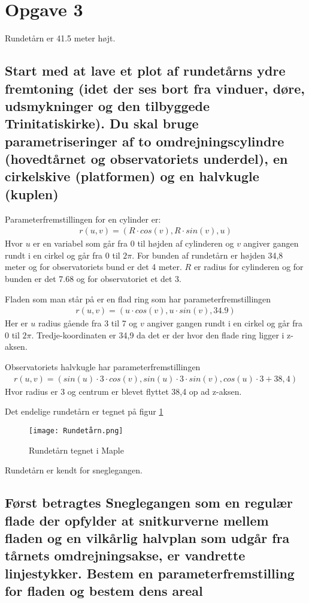 \section{Opgave 3}
Rundetårn er 41.5 meter højt.

\subsection{Start med at lave et plot af rundetårns ydre fremtoning (idet der ses bort fra vinduer, døre, udsmykninger og den tilbyggede Trinitatiskirke). Du skal bruge parametriseringer af to omdrejningscylindre (hovedtårnet og observatoriets underdel), en cirkelskive (platformen) og en halvkugle (kuplen)}

Parameterfremstillingen for en cylinder er:
\begin{align}
    r(u,v) =(R \cdot cos(v), R \cdot sin(v), u) 
\end{align}
Hvor $u$ er en variabel som går fra 0 til højden af cylinderen og $v$ angiver gangen rundt i en cirkel og går fra 0 til $2\pi$. For bunden af rundetårn er højden 34,8 meter og for observatoriets bund er det 4 meter. $R$ er radius for cylinderen og for bunden er det 7.68 og for observatoriet et det 3.

Fladen som man står på er en flad ring som har parameterfremstillingen
\begin{align}
    r(u,v) = (u \cdot cos(v), u \cdot sin(v), 34.9)
\end{align}
Her er $u$ radius gående fra 3 til 7 og $v$ angiver gangen rundt i en cirkel og går fra 0 til $2\pi$. Tredje-koordinaten er 34,9 da det er der hvor den flade ring ligger i z-aksen.

Observatoriets halvkugle har parameterfremstillingen
\begin{align}
    r(u,v) = (sin(u) \cdot 3 \cdot cos(v),sin(u) \cdot 3 \cdot sin(v),cos(u) \cdot 3+38,4)
\end{align}
Hvor radius er 3 og centrum er blevet flyttet 38,4 op ad z-aksen.

Det endelige rundetårn er tegnet på figur \ref{rund}
\begin{figure}[htp]
    \centering
    \texttt{[image: Rundetårn.png]}
        \caption{Rundetårn tegnet i Maple}
    \label{rund}
\end{figure}

\newpage

Rundetårn er kendt for sneglegangen.
\subsection{Først betragtes Sneglegangen som en regulær flade der opfylder at snitkurverne mellem fladen og en vilkårlig halvplan som udgår fra tårnets omdrejningsakse, er vandrette linjestykker. Bestem en parameterfremstilling for fladen og bestem dens areal}


